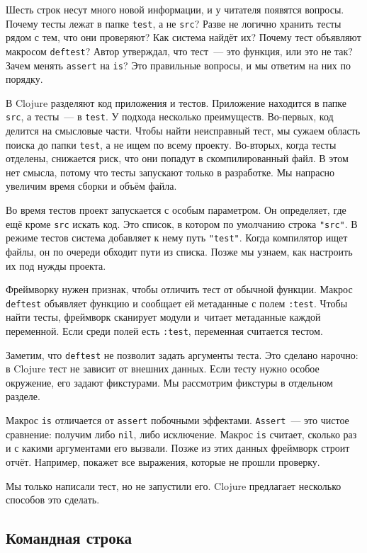 Шесть строк несут много новой информации, и у читателя появятся вопросы. Почему
тесты лежат в папке \verb|test|, а не \verb|src|? Разве не логично хранить тесты
рядом с тем, что они проверяют? Как система найдёт их?  Почему тест объявляют
макросом \verb|deftest|? Автор утверждал, что тест~--- это функция, или это не так?
Зачем менять \verb|assert| на \verb|is|? Это правильные вопросы, и мы ответим на
них по порядку.

В Clojure разделяют код приложения и тестов. Приложение находится в папке
\verb|src|, а тесты~--- в \verb|test|. У подхода несколько
преимуществ. Во-первых, код делится на смысловые части. Чтобы найти неисправный
тест, мы сужаем область поиска до папки \verb|test|, а не ищем по всему
проекту. Во-вторых, когда тесты отделены, снижается риск, что они попадут в
скомпилированный файл. В этом нет смысла, потому что тесты запускают только в
разработке. Мы напрасно увеличим время сборки и объём файла.

Во время тестов проект запускается с особым параметром. Он определяет, где ещё
кроме \verb|src| искать код. Это список, в котором по умолчанию строка
\verb|"src"|. В режиме тестов система добавляет к нему путь \verb|"test"|. Когда
компилятор ищет файлы, он по очереди обходит пути из списка. Позже мы узнаем,
как настроить их под нужды проекта.


Фреймворку нужен признак, чтобы отличить тест от обычной функции. Макрос
\verb|deftest| объявляет функцию и сообщает ей метаданные с полем
\verb|:test|. Чтобы найти тесты, фреймворк сканирует модули и~читает метаданные
каждой переменной. Если среди полей есть \verb|:test|, переменная считается
тестом.

Заметим, что \verb|deftest| не позволит задать аргументы теста. Это сделано
нарочно: в Clojure тест не зависит от внешних данных. Если тесту нужно особое
окружение, его задают фикстурами. Мы рассмотрим фикстуры в отдельном разделе.

Макрос \verb|is| отличается от \verb|assert| побочными
эффектами. \verb|Assert|~--- это чистое сравнение: получим либо \verb|nil|, либо
исключение. Макрос \verb|is| считает, сколько раз и с какими аргументами его
вызвали. Позже из этих данных фреймворк строит отчёт. Например, покажет все
выражения, которые не прошли проверку.

Мы только написали тест, но не запустили его. Clojure предлагает несколько
способов это сделать.

\subsection{Командная строка}

